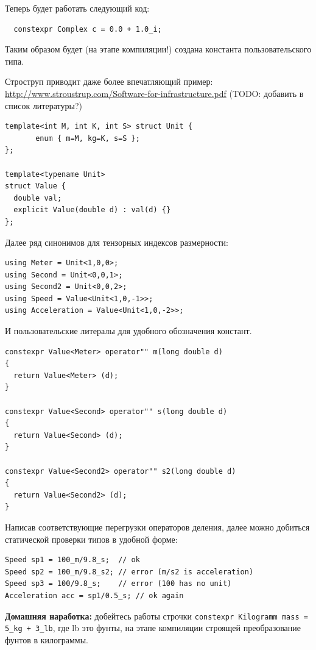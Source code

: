 \documentclass[a4paper,12pt,oneside]{article}
\begin{document}
Теперь будет работать следующий код:

\begin{lstlisting}
  constexpr Complex c = 0.0 + 1.0_i;
\end{lstlisting}

Таким образом будет (на этапе компиляции!) создана константа пользовательского типа.

Строструп приводит даже более впечатляющий пример: \url{http://www.stroustrup.com/Software-for-infrastructure.pdf} (TODO: добавить в список литературы?)

\begin{lstlisting}
template<int M, int K, int S> struct Unit {
       enum { m=M, kg=K, s=S };
};

template<typename Unit> 
struct Value {
  double val; 
  explicit Value(double d) : val(d) {}
};
\end{lstlisting}

Далее ряд синонимов для тензорных индексов размерности:

\begin{lstlisting}
using Meter = Unit<1,0,0>;
using Second = Unit<0,0,1>;
using Second2 = Unit<0,0,2>; 
using Speed = Value<Unit<1,0,-1>>; 
using Acceleration = Value<Unit<1,0,-2>>;
\end{lstlisting}

И пользовательские литералы для удобного обозначения констант.

\begin{lstlisting}
constexpr Value<Meter> operator"" m(long double d)
{
  return Value<Meter> (d);
}   

constexpr Value<Second> operator"" s(long double d)
{
  return Value<Second> (d);  
}   

constexpr Value<Second2> operator"" s2(long double d)
{
  return Value<Second2> (d); 
}
\end{lstlisting}

Написав соответствующие перегрузки операторов деления, далее можно добиться статической проверки типов в удобной форме:

\begin{lstlisting}
Speed sp1 = 100_m/9.8_s;  // ok
Speed sp2 = 100_m/9.8_s2; // error (m/s2 is acceleration)
Speed sp3 = 100/9.8_s;    // error (100 has no unit)
Acceleration acc = sp1/0.5_s; // ok again
\end{lstlisting}

\textbf{Домашняя наработка:} добейтесь работы строчки \lstinline!constexpr Kilogramm mass = 5_kg + 3_lb!, где lb это фунты, на этапе компиляции строящей преобразование фунтов в килограммы.
\end{document}
